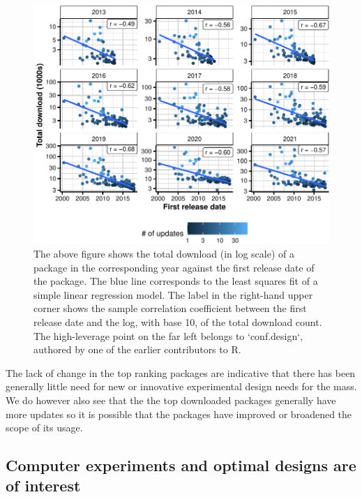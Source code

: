 \documentclass{article}
\begin{document}
\begin{figure}[htbp]

{\centering \includegraphics{figures/established-packages-1} 

}

\caption{The above figure shows the total download (in log scale) of a package in the corresponding year against the first release date of the package. The blue line corresponds to the least squares fit of a simple linear regression model. The label in the right-hand upper corner shows the sample correlation coefficient between the first release date and the log, with base 10, of the total download count. The high-leverage point on the far left belongs to `conf.design`, authored by one of the earlier contributors to R.}\label{fig:established-packages}
\end{figure}

The lack of change in the top ranking packages are indicative that there
has been generally little need for new or innovative experimental design
needs for the mass. We do however also see that the the top downloaded
packages generally have more updates so it is possible that the packages
have improved or broadened the scope of its usage.

\hypertarget{topics}{%
\subsection{Computer experiments and optimal designs are of
interest}\label{topics}}
\end{document}
